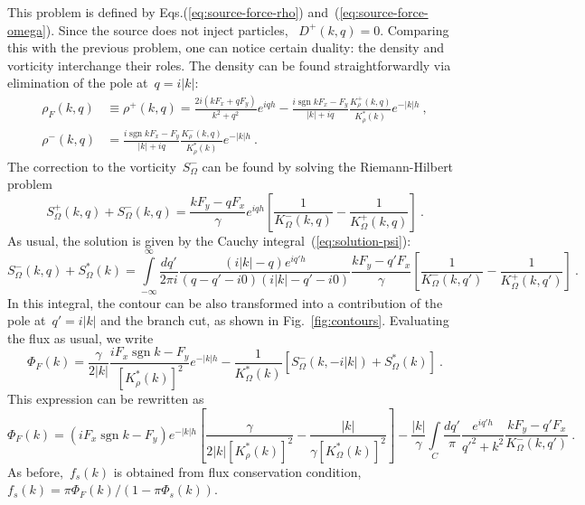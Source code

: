 \documentclass[preprint,aps,eqsecnum, prb]{revtex4-1}
\newcommand{\fplus}[1]{{#1}^{+}}
\newcommand{\fminus}[1]{{#1}^{-}}
\newcommand{\sgn}{\mathop{\mathrm{sgn}}\nolimits}
\begin{document}
This problem is defined by Eqs.(\ref{eq:source-force-rho})
and~(\ref{eq:source-force-omega}). Since the source does not inject particles,
~$\fplus{D}(k, q) = 0$. Comparing this with the previous problem,
one can notice certain duality: the density and vorticity interchange their
roles. The density can be found straightforwardly via elimination of the pole
at~$q = i|k|$:
\begin{align}
  \rho_F(k, q) &\equiv \fplus{\rho}(k, q) = \frac{2i(k F_x + q F_y)}{k^2 + q^2}
  e^{iqh} - \frac{i\sgn k F_x - F_y}{|k| + i q}
   \frac{\fplus{K}_\rho(k, q)}{K_\rho^\ast(k)} e^{-|k|h}
  \ ,
  \\
  \fminus{\rho}(k, q) &= \frac{i\sgn k F_x - F_y}{|k| + iq}
   \frac{\fminus{K}_\rho(k, q)}{K_\rho^\ast(k)} e^{-|k|h}
  \ .
\end{align}
The correction to the vorticity~$\fminus{S}_\Omega$ can be found
 by solving the Riemann-Hilbert problem
\begin{equation}
  \fplus{S}_\Omega(k, q) + \fminus{S}_\Omega(k, q) =
  \frac{k F_y - qF_x}{\gamma} e^{iqh} \left[\frac{1}{\fminus{K}_\Omega(k, q)}
   - \frac{1}{\fplus{K}_\Omega(k, q)} \right]
  \ .
\end{equation}
 As usual, the solution is given
by the Cauchy integral~(\ref{eq:solution-psi}):
\begin{equation}
  \fminus{S}_\Omega(k, q) + S_\Omega^\ast(k) =  \int\limits_{-\infty}^{\infty}
  \frac{dq'}{2\pi i}
  \frac{(i|k| - q) e^{iq'h}}{(q - q' - i0)(i|k| - q' - i0)}
  \frac{k F_y - q'F_x}{\gamma}
  \left[\frac{1}{\fminus{K}_\Omega(k, q')}
            - \frac{1}{\fplus{K}_\Omega(k, q')}\right]
  \ .
\end{equation}
In this integral, the contour can be also transformed into a contribution of
the pole at~$q' = i |k|$ and the branch cut, as shown in Fig.~\ref{fig:contours}.
Evaluating the flux as usual, we write
\begin{equation}
  \Phi_F(k) = \frac{\gamma}{2|k|}\frac{i F_x \sgn k - F_y}{\left[K_\rho^\ast(k)\right]^2}
  e^{-|k| h} - \frac{1}{K_\Omega^\ast(k)} \left[\fminus{S}_\Omega(k, -i|k|) + S_\Omega^\ast(k)\right]
  \ .
\end{equation}
This expression can be rewritten as
\begin{equation}
  \Phi_F(k) =  (i F_x \sgn k - F_y)e^{-|k|h}
  \left[\frac{\gamma}{2|k|\left[K_\rho^\ast(k)\right]^2} - \frac{|k|}{\gamma\left[K_\Omega^\ast(k)\right]^2 }\right]
  -  \frac{|k|}{\gamma}\int\limits_C \frac{dq'}{\pi} \frac{e^{iq'h}}{q'^2 + k^2}
     \frac{k F_y - q'F_x}{\fminus{K}_\Omega(k, q')}
     \ .
\end{equation}
As before,~$f_s(k)$ is obtained from flux conservation condition,
$f_s(k) = \pi \Phi_F(k)/(1 - \pi \Phi_s(k))$.
\end{document}
